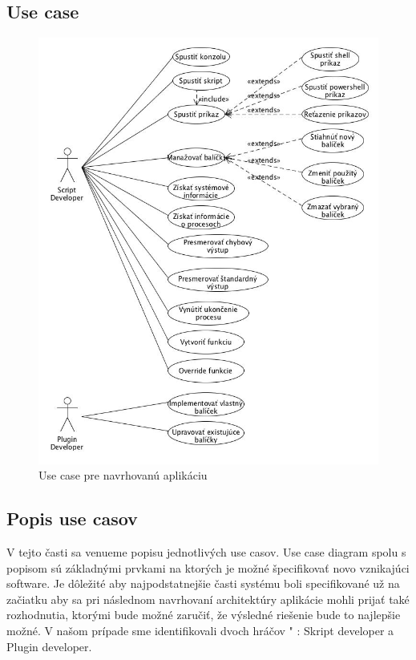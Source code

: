 \subsection{Use case}
\indent 
\begin{figure}[!htbp]
	\centering
	\includegraphics[scale=0.7]{img/usecase.jpg}
	\caption{Use case pre navrhovanú aplikáciu}
	\label{fig:test}
\end{figure}
\newpage
\subsection{Popis use casov}
\indent V tejto časti sa venueme popisu jednotlivých use casov. Use case diagram spolu s popisom sú základnými prvkami na ktorých je možné špecifikovať novo vznikajúci software. Je dôležité aby najpodstatnejšie časti systému boli specifikované už na začiatku aby sa pri následnom navrhovaní architektúry aplikácie mohli prijať také rozhodnutia, ktorými bude možné zaručiť, že výsledné riešenie bude to najlepšie možné. V našom prípade sme identifikovali dvoch hráčov " : Skript developer a Plugin developer. 
